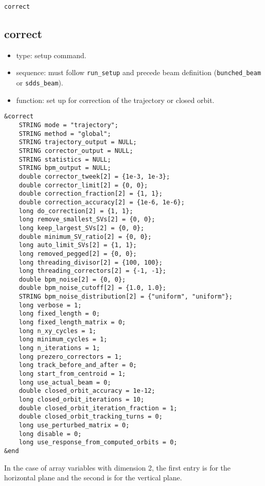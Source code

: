 \documentclass[11pt]{article}
\begin{document}
\newpage
\begin{center}{\Large\verb|correct|}\end{center}
\subsection{correct \label{subsec:correct}}

\begin{itemize}
\item type: setup command.
\item sequence: must follow \verb|run_setup| and precede beam definition (\verb|bunched_beam| or \verb|sdds_beam|).
\item function: set up for correction of the trajectory or closed orbit.
\end{itemize}

\begin{verbatim}
&correct
    STRING mode = "trajectory";
    STRING method = "global";
    STRING trajectory_output = NULL;
    STRING corrector_output = NULL;
    STRING statistics = NULL;
    STRING bpm_output = NULL;
    double corrector_tweek[2] = {1e-3, 1e-3};
    double corrector_limit[2] = {0, 0};
    double correction_fraction[2] = {1, 1};
    double correction_accuracy[2] = {1e-6, 1e-6};
    long do_correction[2] = {1, 1};
    long remove_smallest_SVs[2] = {0, 0};
    long keep_largest_SVs[2] = {0, 0};
    double minimum_SV_ratio[2] = {0, 0};
    long auto_limit_SVs[2] = {1, 1};
    long removed_pegged[2] = {0, 0};
    long threading_divisor[2] = {100, 100};
    long threading_correctors[2] = {-1, -1};
    double bpm_noise[2] = {0, 0};
    double bpm_noise_cutoff[2] = {1.0, 1.0};
    STRING bpm_noise_distribution[2] = {"uniform", "uniform"};
    long verbose = 1;
    long fixed_length = 0;
    long fixed_length_matrix = 0;
    long n_xy_cycles = 1;
    long minimum_cycles = 1;
    long n_iterations = 1;
    long prezero_correctors = 1;
    long track_before_and_after = 0;
    long start_from_centroid = 1;
    long use_actual_beam = 0;
    double closed_orbit_accuracy = 1e-12;
    long closed_orbit_iterations = 10;
    double closed_orbit_iteration_fraction = 1;
    double closed_orbit_tracking_turns = 0;
    long use_perturbed_matrix = 0;
    long disable = 0;
    long use_response_from_computed_orbits = 0;
&end
\end{verbatim}

In the case of array variables with dimension 2, the first entry is for the horizontal plane and the second
is for the vertical plane.
\end{document}
